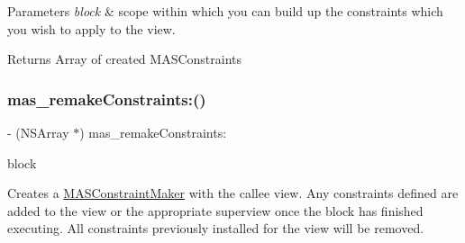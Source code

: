 \begin{DoxyParams}{Parameters}
{\em block} & scope within which you can build up the constraints which you wish to apply to the view.\\
\hline
\end{DoxyParams}
\begin{DoxyReturn}{Returns}
Array of created M\+A\+S\+Constraints 
\end{DoxyReturn}
\mbox{\label{category_m_a_s___v_i_e_w_07_m_a_s_additions_08_a694b415beed5f32c5d1215f988bca6d0}} 
\subsubsection{\texorpdfstring{mas\+\_\+remake\+Constraints\+:()}{mas\_remakeConstraints:()}}
{\footnotesize\ttfamily -\/ (N\+S\+Array $\ast$) mas\+\_\+remake\+Constraints\+: \begin{DoxyParamCaption}\item[{(void($^\wedge$)(\mbox{\hyperlink{interface_m_a_s_constraint_maker}{M\+A\+S\+Constraint\+Maker}} $\ast$make))}]{block }\end{DoxyParamCaption}}

Creates a \mbox{\hyperlink{interface_m_a_s_constraint_maker}{M\+A\+S\+Constraint\+Maker}} with the callee view. Any constraints defined are added to the view or the appropriate superview once the block has finished executing. All constraints previously installed for the view will be removed.


